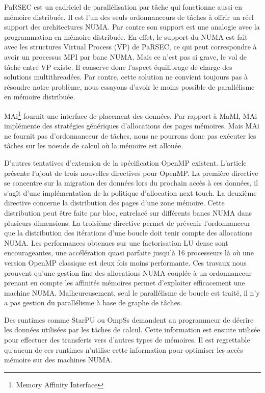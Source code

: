 PaRSEC est un cadriciel de parallélisation par tâche qui fonctionne aussi en mémoire distribuée.
%
Il est l'un des seuls ordonnanceurs de tâches à offrir un réel support des architectures NUMA.
%
Par contre son support est une analogie avec la programmation en mémoire distribuée.
%
En effet, le support du NUMA est fait avec les structures Virtual Process (VP) de PaRSEC, ce qui peut correspondre à avoir un processus MPI par banc NUMA.
%
Mais ce n'est pas si grave, le vol de tâche entre VP existe.
%
Il conserve donc l'aspect équilibrage de charge des solutions multithreadées.
%
Par contre, cette solution ne convient toujours pas à résoudre notre problème, nous essayons d'avoir le moins possible de parallélisme en mémoire distribuée.

MAi\footnote{Memory Affinity Interface}\cite{mai} fournit une interface de placement des données.
%
Par rapport à MaMI, MAi implémente des stratégies génériques d'allocations des pages mémoires.
%
Mais MAi ne fournit pas d'ordonnanceur de tâches, nous ne pourrons donc pas exécuter les tâches sur les noeuds de calcul où la mémoire est allouée.


D'autres tentatives d'extension de la spécification OpenMP existent.
%
L'article~\cite{openmp_numa} présente l'ajout de trois nouvelles directives pour OpenMP.
%
La première directive se concentre sur la migration des données lors du prochain accès à ces données, il s'agît d'une implémentation de la politique d'allocation next touch.
%
La deuxième directive concerne la distribution des pages d'une zone mémoire.
%
Cette distribution peut être faite par bloc, entrelacé sur différents bancs NUMA dans plusieurs dimensions.
%
La troisième directive permet de prévenir l'ordonnanceur que la distribution des itérations d'une boucle doit tenir compte des allocations NUMA.
%
Les performances obtenues sur une factorisation LU dense sont encourageantes, une accélération quasi parfaite jusqu'à 16 processeurs là où une version OpenMP classique est deux fois moins performante.
%
Ces travaux nous prouvent qu'une gestion fine des allocations NUMA couplée à un ordonnanceur prenant en compte les affinités mémoires permet d'exploiter efficacement une machine NUMA.
%
Malheureusement, seul le parallélisme de boucle est traité, il n'y a pas gestion du parallélisme à base de graphe de tâches.

Des runtimes comme StarPU ou OmpSs demandent au programmeur de décrire les données utilisées par les tâches de calcul.
%
Cette information est ensuite utilisée pour effectuer des transferts vers d'autres types de mémoires.
%
Il est regrettable qu'aucun de ces runtimes n'utilise cette information pour optimiser les accès mémoire sur des machines NUMA.
